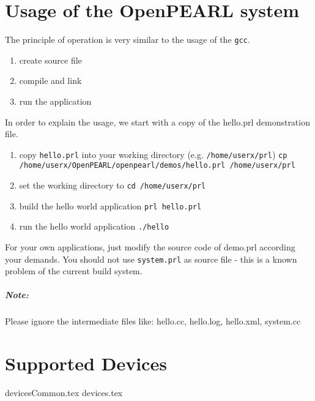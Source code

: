 \documentclass[oneside,10pt]{scrbook}
\begin{document}
\chapter{Usage of the OpenPEARL system}

The principle of operation is very similar to the usage of the \texttt{gcc}.

\begin{enumerate}
\item create source file
\item compile and link
\item run the application
\end{enumerate}

In order to explain the usage, we start with a copy of the hello.prl demonstration file.

\begin{enumerate}
\item copy \texttt{hello.prl} into your working directory (e.g. \texttt{/home/userx/prl}) \newline
   \texttt{cp /home/userx/OpenPEARL/openpearl/demos/hello.prl /home/userx/prl}
\item set the working directory to \newline
   \texttt{cd /home/userx/prl}
\item build the hello world application \newline
   \texttt{prl hello.prl}
\item run the hello world application \newline
   \texttt{./hello}
\end{enumerate}

For your own applications, just modify the source code of demo.prl according your demands.
You should not use \texttt{system.prl} as source file - this is a known problem of the current
build system.


\paragraph{Note:}
Please ignore the intermediate files like:
hello.cc, hello.log, hello.xml, system.cc



\chapter{Supported Devices}
{devicesCommon.tex}
{devices.tex}
\end{document}
